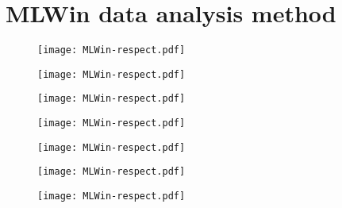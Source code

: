
\chapter{MLWin data analysis method}
\label{appendixb}

\begin{figure}[htbp]
\centerline{\texttt{[image: MLWin-respect.pdf]}}
\label{partinfosheet1}
\end{figure}

\newpage

\begin{figure}[htbp]
\centerline{\texttt{[image: MLWin-respect.pdf]}}
\label{partinfosheet2}
\end{figure}

\newpage

\begin{figure}[htbp]
\centerline{\texttt{[image: MLWin-respect.pdf]}}
\label{partinfosheet3}
\end{figure}

\newpage

\begin{figure}[htbp]
\centerline{\texttt{[image: MLWin-respect.pdf]}}
\label{partinfosheet4}
\end{figure}

\newpage

\begin{figure}[htbp]
\centerline{\texttt{[image: MLWin-respect.pdf]}}
\label{partinfosheet5}
\end{figure}

\newpage

\begin{figure}[htbp]
\centerline{\texttt{[image: MLWin-respect.pdf]}}
\label{partinfosheet6}
\end{figure}

\newpage

\begin{figure}[htbp]
\centerline{\texttt{[image: MLWin-respect.pdf]}}
\label{partinfosheet7}
\end{figure}

\newpage

